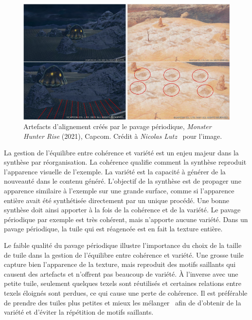 \begin{figure}
    \centering
    \includegraphics[width=\textwidth]{contenu/resources/images/periodic_tiling}
    \caption[Artefacts d'alignement créés par le pavage périodique]{Artefacts d'alignement créés par le pavage périodique, \textit{Monster Hunter Rise} (2021), Capcom. Crédit à \textit{Nicolas Lutz}~\cite{lutz_processus_2021} pour l'image.}
    \label{fig:periodic-tiling}
\end{figure}

La gestion de l'équilibre entre cohérence et variété est un enjeu majeur dans la synthèse par réorganisation. La cohérence qualifie comment la synthèse reproduit l'apparence visuelle de l'exemple. La variété est la capacité à générer de la nouveauté dans le contenu généré. L'objectif de la synthèse est de propager une apparence similaire à l'exemple sur une grande surface, comme si l'apparence entière avait été synthétisée directement par un unique procédé. Une bonne synthèse doit ainsi apporter à la fois de la cohérence et de la variété. Le pavage périodique par exemple est très cohérent, mais n'apporte aucune variété. Dans un pavage périodique, la tuile qui est réagencée est en fait la texture entière.

\bigskip

Le faible qualité du pavage périodique illustre l'importance du choix de la taille de tuile dans la gestion de l'équilibre entre cohérence et variété. Une grosse tuile capture bien l'apparence de la texture, mais reproduit des motifs saillants qui causent des artefacts et n'offrent pas beaucoup de variété. À l'inverse avec une petite tuile, seulement quelques texels sont réutilisés et certaines relations entre texels éloignés sont perdues, ce qui cause une perte de cohérence. Il est préférable de prendre des tuiles plus petites et mieux les mélanger~\cite{heitz_high-performance_2018} afin de d'obtenir de la variété et d'éviter la répétition de motifs saillants.


